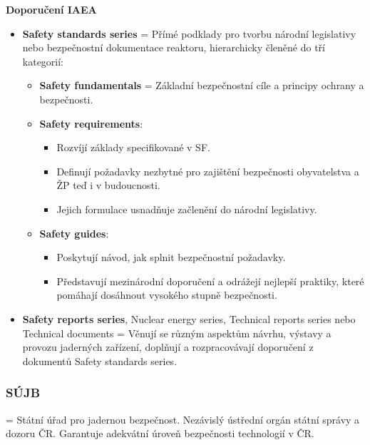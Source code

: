 \textbf{Doporučení IAEA}

\begin{itemize}
    \item \textbf{Safety standards series} = Přímé podklady pro tvorbu národní legislativy nebo bezpečnostní dokumentace reaktoru, hierarchicky členěné do tří kategorií:
    \begin{itemize}
        \item \textbf{Safety fundamentals} = Základní bezpečnostní cíle a principy ochrany a bezpečnosti.
        \item \textbf{Safety requirements}:
        \begin{itemize}
            \item Rozvíjí základy specifikované v SF.
            \item Definují požadavky nezbytné pro zajištění bezpečnosti obyvatelstva a ŽP teď i v budoucnosti.
            \item Jejich formulace usnadňuje začlenění do národní legislativy.
        \end{itemize}
        \item \textbf{Safety guides}:
        \begin{itemize}
            \item Poskytují návod, jak splnit bezpečnostní požadavky.
            \item Představují mezinárodní doporučení a odrážejí nejlepší praktiky, které pomáhají dosáhnout vysokého stupně bezpečnosti.
        \end{itemize}
    \end{itemize}
    \item \textbf{Safety reports series}, Nuclear energy series, Technical reports series nebo Technical documents = Věnují se různým aspektům návrhu, výstavy a provozu jaderných zařízení, doplňují a rozpracovávají doporučení z dokumentů Safety standards series.
\end{itemize}

\subsubsection{SÚJB}

= Státní úřad pro jadernou bezpečnost. Nezávislý ústřední orgán státní správy a dozoru ČR. Garantuje adekvátní úroveň bezpečnosti technologií v ČR.

